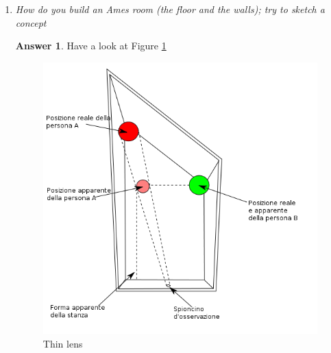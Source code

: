 \documentclass[a4paper,12 pt]{article}
\theoremstyle{definition}
\theoremstyle{remark}
\theoremstyle{definition}
\theoremstyle{definition}
\theoremstyle{definition}
\theoremstyle{definition}
\theoremstyle{remark}
\theoremstyle{remark}
\theoremstyle{definition}
\theoremstyle{definition}
\newtheorem*{answer}{Answer}
\begin{document}
\begin{enumerate}
\item \textit{How do you build an Ames room (the floor and the walls); try to sketch a concept}
\begin{answer}
Have a look at Figure \ref{fig:ames}
\begin{figure}[h!]
\begin{center}
\includegraphics[scale=0.45]{pics/ames}
\caption{Thin lens \label{fig:ames}}
\end{center}
\end{figure}
\end{answer}


\end{enumerate}
\end{document}
